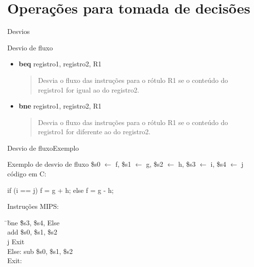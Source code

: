 

\section{Operações para tomada de decisões}

\begin{frame}{Desvios}
\vspace{-0.25cm}
\begin{block}{Desvio de fluxo}
  \begin{itemize}
  \item {\bf beq} registro1, registro2, R1
    \begin{quote}
      { Desvia o fluxo das instruções para o rótulo R1 se o conteúdo do
      registro1 for \alert{igual} ao do registro2.}
    \end{quote}
  \item {\bf bne} registro1, registro2, R1
    \begin{quote}
      { Desvia o fluxo das instruções para o rótulo R1 se o conteúdo do
      registro1 for \alert{diferente} ao do registro2.}
    \end{quote}
  \end{itemize}
\end{block}
\end{frame}

\begin{frame}{Desvio de fluxo}{Exemplo}
\begin{block}{Exemplo de desvio de fluxo}
  \$s0 $\leftarrow$ f, \$s1 $\leftarrow$ g, \$s2 $\leftarrow$ h, \$s3
  $\leftarrow$ i, \$s4 $\leftarrow$ j\\
  \smallskip
  código em C:\\
  \begin{tt}
    \hspace{0.5cm} if (i == j) f = g + h; else f = g - h;\\
  \end{tt}
  \bigskip
  Instruções MIPS:
\begin{tabbing}
  \hspace{1cm}\=\hspace{1cm}\= bne \=\$s3, \$s4, Else\\
  \>\>add \$s0, \$s1, \$s2\\
  \>\>j \>Exit\\
  \>Else:\> sub \$s0, \$s1, \$s2 \\
  \>Exit:\\
\end{tabbing}

\end{block}

\end{frame}

